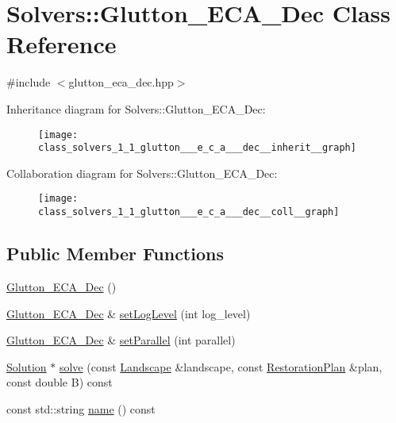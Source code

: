 \hypertarget{class_solvers_1_1_glutton___e_c_a___dec}{}\section{Solvers\+:\+:Glutton\+\_\+\+E\+C\+A\+\_\+\+Dec Class Reference}
\label{class_solvers_1_1_glutton___e_c_a___dec}


{\ttfamily \#include $<$glutton\+\_\+eca\+\_\+dec.\+hpp$>$}



Inheritance diagram for Solvers\+:\+:Glutton\+\_\+\+E\+C\+A\+\_\+\+Dec\+:\nopagebreak
\begin{figure}[H]
\begin{center}
\leavevmode
\texttt{[image: class\_solvers\_1\_1\_glutton\_\_\_e\_c\_a\_\_\_dec\_\_inherit\_\_graph]}
\end{center}
\end{figure}


Collaboration diagram for Solvers\+:\+:Glutton\+\_\+\+E\+C\+A\+\_\+\+Dec\+:\nopagebreak
\begin{figure}[H]
\begin{center}
\leavevmode
\texttt{[image: class\_solvers\_1\_1\_glutton\_\_\_e\_c\_a\_\_\_dec\_\_coll\_\_graph]}
\end{center}
\end{figure}
\subsection*{Public Member Functions}
\begin{DoxyCompactItemize}
\item 
\hyperlink{class_solvers_1_1_glutton___e_c_a___dec_a4afb4df597dd89d1b24bc1def390b829}{Glutton\+\_\+\+E\+C\+A\+\_\+\+Dec} ()
\item 
\hyperlink{class_solvers_1_1_glutton___e_c_a___dec}{Glutton\+\_\+\+E\+C\+A\+\_\+\+Dec} \& \hyperlink{class_solvers_1_1_glutton___e_c_a___dec_ac00e2e76cc44f814db12a5ddea0177f3}{set\+Log\+Level} (int log\+\_\+level)
\item 
\hyperlink{class_solvers_1_1_glutton___e_c_a___dec}{Glutton\+\_\+\+E\+C\+A\+\_\+\+Dec} \& \hyperlink{class_solvers_1_1_glutton___e_c_a___dec_ad91bf6be2581ac099127ed4fe5248210}{set\+Parallel} (int parallel)
\item 
\hyperlink{class_solution}{Solution} $\ast$ \hyperlink{class_solvers_1_1_glutton___e_c_a___dec_a6b7078518779722dfaed6b1b1a9ba502}{solve} (const \hyperlink{class_landscape}{Landscape} \&landscape, const \hyperlink{class_restoration_plan}{Restoration\+Plan} \&plan, const double B) const
\item 
const std\+::string \hyperlink{class_solvers_1_1_glutton___e_c_a___dec_a2990dbcfecba9673d4bbae331aee1a04}{name} () const
\end{DoxyCompactItemize}
